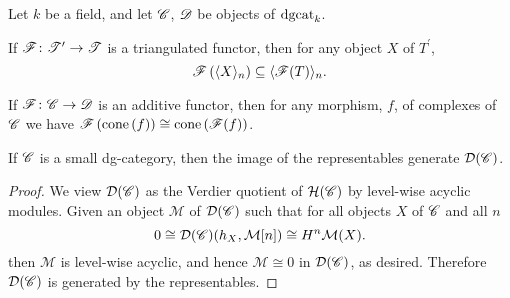 \documentclass[dissertation.tex]{subfiles}
\begin{document}
\begin{lem}
  Let $k$ be a field, and let $\mathscr{C}$, $\mathscr{D}$ be objects of $\operatorname{dgcat}_k$.
  
\end{lem}

\begin{lem}\label{TriangulatedFunctorsPreserveGens}
  If $\mathscr{F} \colon \mathscr{T}^\prime \to \mathscr{T}$ is a triangulated functor, then for any object $X$ of $T^\prime$, 
  $$\mathscr{F}\left(\langle X \rangle_n\right) \subseteq \langle \mathscr{F}(T) \rangle_n.$$
\end{lem}

\begin{lem}\label{AdditiveFunctorsCommuteWithCones}
  If $\mathscr{F} \colon \mathscr{C} \rightarrow \mathscr{D}$ is an additive functor, then for any morphism, $f$, of complexes of $\mathscr{C}$ we have
  $\mathscr{F}\left(\operatorname{cone}\left(f\right)\right) \cong \operatorname{cone}\left(\mathscr{F}(f)\right)$.
\end{lem}

\begin{lem}\label{RepresentablesGenerateSmallDG}
  If $\mathscr{C}$ is a small dg-category, then the image of the representables generate $\mathcal{D}(\mathscr{C})$.

  \begin{proof}
    We view $\mathcal{D}(\mathscr{C})$ as the Verdier quotient of $\mathcal{H}(\mathscr{C})$ by level-wise acyclic modules.
    Given an object $\mathcal{M}$ of $\mathcal{D}(\mathscr{C})$ such that for all objects $X$ of $\mathscr{C}$ and all $n$
    $$0 \cong \mathcal{D}(\mathscr{C})(h_X, \mathcal{M}[n]) \cong H^n\mathcal{M}(X).$$
    then $\mathcal{M}$ is level-wise acyclic, and hence $\mathcal{M} \cong 0$ in $\mathcal{D}(\mathscr{C})$, as desired.
    Therefore $\mathcal{D}(\mathscr{C})$ is generated by the representables.
  \end{proof}
\end{lem}
\end{document}
